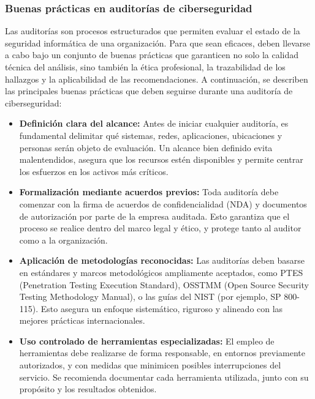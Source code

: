 \documentclass[a4paper, 10pt]{article}
\begin{document}
\subsubsection{Buenas prácticas en auditorías de ciberseguridad}

Las auditorías son procesos estructurados que permiten evaluar el estado de la seguridad informática de una organización. 
Para que sean eficaces, deben llevarse a cabo bajo un conjunto de buenas prácticas que garanticen no solo la calidad técnica del análisis, sino también la ética profesional, 
la trazabilidad de los hallazgos y la aplicabilidad de las recomendaciones. A continuación, se describen las principales buenas prácticas que deben seguirse durante una auditoría de ciberseguridad:

\begin{itemize}

    \item \textbf{Definición clara del alcance:}  
    Antes de iniciar cualquier auditoría, es fundamental delimitar qué sistemas, redes, aplicaciones, ubicaciones y personas serán objeto de evaluación. Un alcance bien definido evita malentendidos, asegura que los recursos estén disponibles y permite centrar los esfuerzos en los activos más críticos.

    \item \textbf{Formalización mediante acuerdos previos:}  
    Toda auditoría debe comenzar con la firma de acuerdos de confidencialidad (NDA) y documentos de autorización por parte de la empresa auditada. Esto garantiza que el proceso se realice dentro del marco legal y ético, y protege tanto al auditor como a la organización.

    \item \textbf{Aplicación de metodologías reconocidas:}  
    Las auditorías deben basarse en estándares y marcos metodológicos ampliamente aceptados, como PTES (Penetration Testing Execution Standard), OSSTMM (Open Source Security Testing Methodology Manual), o las guías del NIST (por ejemplo, SP 800-115). Esto asegura un enfoque sistemático, riguroso y alineado con las mejores prácticas internacionales.

    \item \textbf{Uso controlado de herramientas especializadas:}  
    El empleo de herramientas debe realizarse de forma responsable, en entornos previamente autorizados, y con medidas que minimicen posibles interrupciones del servicio. Se recomienda documentar cada herramienta utilizada, junto con su propósito y los resultados obtenidos.


\end{itemize}
\end{document}
